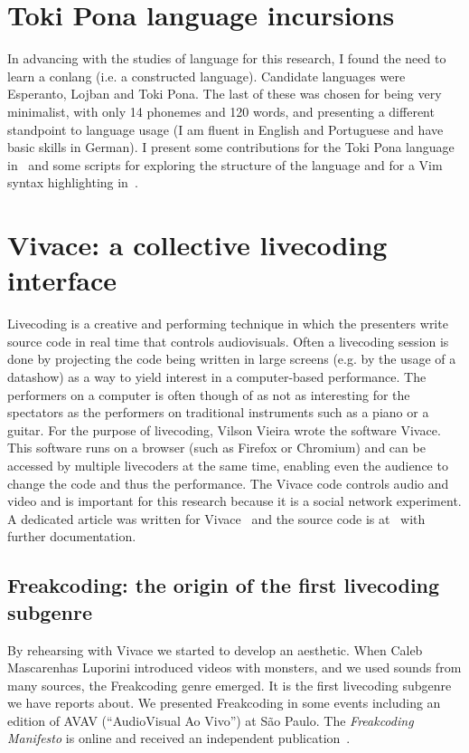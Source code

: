 \begin{apendicesenv}
\section{Toki Pona language incursions}
In advancing with the studies of language for this research,
I found the need to learn a conlang (i.e. a constructed language).
Candidate languages were Esperanto, Lojban and Toki Pona.
The last of these was chosen for being very minimalist,
with only 14 phonemes and 120 words,
and presenting a different standpoint to language usage
(I am fluent in English and Portuguese and have basic skills in German).
I present some contributions for the Toki Pona language in~\cite{tokiio}
and some scripts for exploring the structure of the language and for
a Vim syntax highlighting in~\cite{tokir}.

\section{Vivace: a collective livecoding interface}\label{sec:vivace}
Livecoding is a creative and performing technique in which the
presenters write source code in real time that controls audiovisuals.
Often a livecoding session is done by projecting the code being written in
large screens (e.g. by the usage of a datashow) as a way to yield
interest in a computer-based performance.
The performers on a computer is often though of as not as interesting
for the spectators as the performers on traditional instruments such as a piano or a guitar.
For the purpose of livecoding, Vilson Vieira wrote the software Vivace.
This software runs on a browser (such as Firefox or Chromium)
and can be accessed by multiple livecoders at the same time,
enabling even the audience to change the code and thus the performance.
The Vivace code controls audio and video and is important for
this research because it is a social network experiment.
A dedicated article was written for Vivace~\cite{vivacecmj}
and the source code is at~\cite{vivacecode} with further documentation.

\subsection{Freakcoding: the origin of the first livecoding subgenre}
By rehearsing with Vivace we started to develop an aesthetic.
When Caleb Mascarenhas Luporini introduced videos with monsters,
and we used sounds from many sources,
the Freakcoding genre emerged.
It is the first livecoding subgenre we have reports about.
We presented Freakcoding in some events including an edition
of AVAV (``AudioVisual Ao Vivo'') at São Paulo.
The \emph{Freakcoding Manifesto} is online and received
an independent publication~\cite{freakManifesto}.


\end{apendicesenv}

